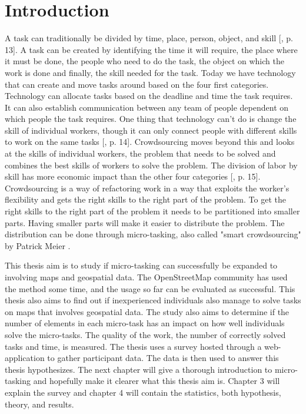 \chapter{Introduction}

 
A task can traditionally be divided by time, place, person, object, and skill [\citep{Meier2013}, p. 13]. A task can be created by identifying the time it will require, the place where it must be done, the people who need to do the task, the object on which the work is done and finally, the skill needed for the task. Today we have technology that can create and move tasks around based on the four first categories.  Technology can allocate tasks based on the deadline and time the task requires. It can also establish communication between any team of people dependent on which people the task requires. One thing that technology can't do is change the skill of individual workers, though it can only connect people with different skills to work on the same tasks [\citep{Meier2013}, p. 14]. Crowdsourcing moves beyond this and looks at the skills of individual workers, the problem that needs to be solved and combines the best skills of workers to solve the problem. The division of labor by skill has more economic impact than the other four categories [\citep{Meier2013}, p. 15]. Crowdsourcing is a way of refactoring work in a way that exploits the worker's flexibility and gets the right skills to the right part of the problem. To get the right skills to the right part of the problem it needs to be partitioned into smaller parts. Having smaller parts will make it easier to distribute the problem. The distribution can be done through micro-tasking, also called "smart crowdsourcing" by Patrick Meier \citep{Meier2013a}. 

This thesis aim is to study if micro-tasking can successfully be expanded to involving maps and geospatial data. The OpenStreetMap community has used the method some time, and the usage so far can be evaluated as successful. %
This thesis also aims to find out if inexperienced individuals also manage to solve tasks on maps that involves geospatial data. The study also aims to determine if the number of elements in each micro-task has an impact on how well individuals solve the micro-tasks. The quality of the work, the number of correctly solved tasks and time, is measured. The thesis uses a survey hosted through a web-application to gather participant data. The data is then used to answer this thesis hypothesizes. The next chapter will give a thorough introduction to micro-tasking and hopefully make it clearer what this thesis aim is. Chapter 3 will explain the survey and chapter 4 will contain the statistics, both hypothesis, theory, and results. 
